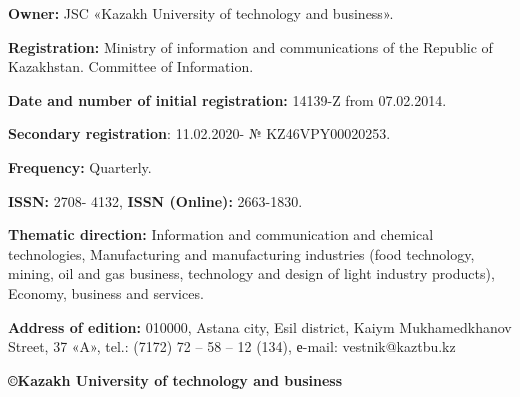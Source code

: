 \textbf{Owner:} JSC «Kazakh University of technology and business».

\textbf{Registration:} Ministry of information and communications of the
Republic of Kazakhstan. Committee of Information.

\textbf{Date and number of initial registration:} 14139-Z from
07.02.2014.

\textbf{Secondary registration}: 11.02.2020- № KZ46VPY00020253.

\textbf{Frequency:} Quarterly.

\textbf{ISSN:} 2708- 4132, \textbf{ISSN (Online):} 2663-1830.

\textbf{Thematic direction:} Information and communication and chemical
technologies, Manufacturing and manufacturing industries (food
technology, mining, oil and gas business, technology and design of light
industry products), Economy, business and services.

\textbf{Address of edition:} 010000, Astana city, Esil district, Kaiym
Mukhamedkhanov Street, 37 «A», tel.: (7172) 72 -- 58 -- 12 (134),
е-mail: vestnik@kaztbu.kz

\begin{center}
\textbf{\large ©Kazakh University of technology and business}
\end{center}

\pagebreak
